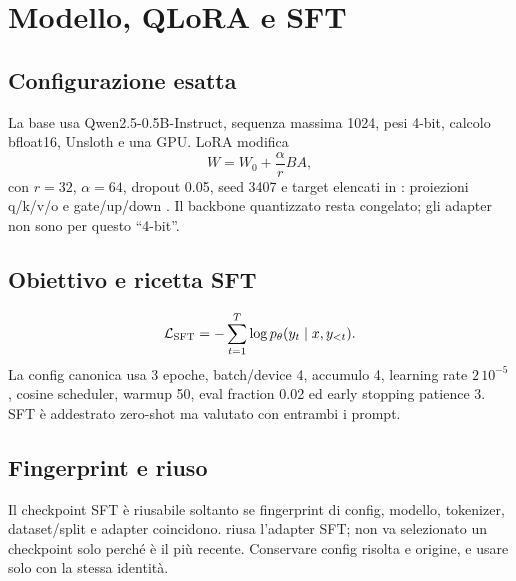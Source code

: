 \chapter{Modello, QLoRA e SFT}\label{chap:sft}
\section{Configurazione esatta}
La base usa Qwen2.5-0.5B-Instruct, sequenza massima 1024, pesi 4-bit, calcolo
bfloat16, Unsloth e una GPU. LoRA modifica
\begin{equation}W=W_0+\frac{\alpha}{r}BA,\end{equation}
con $r=32$, $\alpha=64$, dropout 0.05, seed 3407 e target elencati in
: proiezioni q/k/v/o e gate/up/down \cite{hu2021lora}. Il
backbone quantizzato resta congelato; gli adapter non sono per questo ``4-bit''.

\section{Obiettivo e ricetta SFT}
\begin{equation}\mathcal L_{\rm SFT}=-\sum_{t=1}^{T}\log p_\theta(y_t\mid x,y_{<t}).\end{equation}
La config canonica  usa 3 epoche, batch/device 4,
accumulo 4, learning rate $2\,10^{-5}$, cosine scheduler, warmup 50, eval fraction
0.02 ed early stopping patience 3. SFT è addestrato zero-shot ma valutato con
entrambi i prompt.

\section{Fingerprint e riuso}
Il checkpoint SFT è riusabile soltanto se fingerprint di config, modello,
tokenizer, dataset/split e adapter coincidono.  riusa l'adapter
SFT; non va selezionato un checkpoint solo perché è il più recente. Conservare
config risolta e origine, e usare  solo con la stessa identità.
